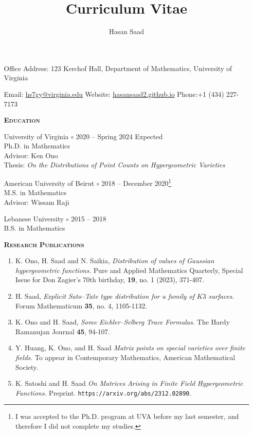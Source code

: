 \documentclass[11pt]{amsart}
\title{\large{Curriculum Vitae}}
\author{\large{Hasan Saad}}
\theoremstyle{remark}
\begin{document}
\textbf{ }


\maketitle 


\large{Office Address: 123 Kerchof Hall, Department of Mathematics, University of Virginia}

\large{Email: \href{mailto:hs7gy@virginia.edu}{hs7gy@virginia.edu} \hfill Website: \href{https://hasansaad2.github.io/}{hasansaad2.github.io} \hfill Phone:+1 (434) 227-7173}

\vspace{.1in}


\large{\textbf{\textsc{\textsc{Education}}}

University of Virginia $\circ$ 2020 -- Spring 2024 Expected \\
Ph.D. in Mathematics\\ Advisor: Ken Ono \\
Thesis: \textit{On the Distributions of Point Counts on Hypergeometric Varieties}

\vspace{.1in}

American University of Beirut $\circ$ 2018 -- December 2020\footnote{I was accepted to the Ph.D. program at UVA before my last semester, and therefore I did not complete my studies.} \\
M.S. in Mathematics\\ Advisor: Wissam Raji

\vspace{.1in}

Lebanese University $\circ$ 2015 -- 2018 \\
B.S. in Mathematics

\vspace{.1in}


\large{\textbf{\textsc{Research Publications}}}
\begin{enumerate}[label=\arabic*.]
\item K. Ono, H. Saad and N. Saikia, \textit{Distribution of values of Gaussian hypergeometric functions.}  Pure and Applied Mathematics Quarterly, Special Issue for Don Zagier’s 70th birthday, {\bf 19}, no. 1 (2023), 371-407. 
\item H. Saad, \textit{Explicit Sato--Tate type distribution for a family of $K3$ surfaces.} Forum Mathematicum {\bf 35}, no. 4, 1105-1132.
\item K. Ono and H. Saad, \textit{Some Eichler--Selberg Trace Formulas.} The Hardy Ramanujan Journal {\bf 45}, 94-107.
\item Y. Huang, K. Ono, and H. Saad \textit{Matrix points on special varieties over finite fields.} To appear in Contemporary Mathematics, American Mathematical Society.
\item K. Satoshi and H. Saad \textit{On Matrices Arising in Finite Field Hypergeometric Functions.} Preprint. \texttt{https://arxiv.org/abs/2312.02890}.


\end{enumerate}}
\end{document}
